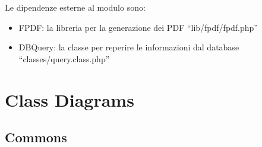 \documentclass[a4paper, 12pt]{report}
\begin{document}
Le dipendenze esterne al modulo sono:
\begin{itemize}
	\item FPDF: la libreria per la generazione dei PDF 
	``lib/fpdf/fpdf.php''
	\item DBQuery: la classe per reperire le informazioni dal database 
	``classes/query.class.php''
\end{itemize}

\chapter{Class Diagrams}

\section{Commons}
\end{document}
